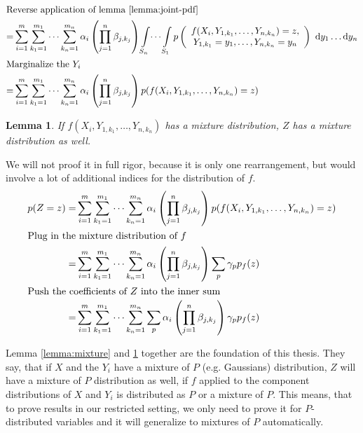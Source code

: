 \documentclass[11pt,a4paper]{book}
\newtheorem{lemma}{Lemma}
\newcommand{\ontopof}[2]{
  \begin{array}{c}
    #1,\\#2
  \end{array}
}
\begin{document}
\begin{proof2}
\begin{align*}
    \intertext{Reverse application of lemma \ref{lemma:joint-pdf}}
    = & \sum_{i = 1}^{m} \sum_{k_{1} = 1}^{m_{1}} \dots \sum_{k_{n} = 1}^{m_{n}} \alpha_{i} \left( \prod_{j = 1}^{n} \beta_{j,k_{j}} \right) \int\limits_{S_{n}} \dots \int\limits_{S_{1}} p\left( \ontopof{f(X_{i}, Y_{1,k_{1}}, \dots, Y_{n,k_{n}}) = z}{Y_{1,k_{1}} = y_{1}, \dots, Y_{n,k_{n}} = y_{n}} \right)~\mathrm{d}y_{1}\dots \mathrm{d}y_{n}\\
    \intertext{Marginalize the $Y_{i}$}
    = & \sum_{i = 1}^{m} \sum_{k_{1} = 1}^{m_{1}} \dots \sum_{k_{n} = 1}^{m_{n}} \alpha_{i} \left( \prod_{j = 1}^{n} \beta_{j,k_{j}} \right) p(f(X_{i}, Y_{1,k_{1}}, \dots, Y_{n,k_{n}}) = z)
  \end{align*}
\end{proof2}

\begin{lemma}
  \label{lemma:components}
  If $f(X_{i}, Y_{1,k_{1}}, \dots, Y_{n,k_{n}})$ has a mixture distribution, $Z$
  has a mixture distribution as well.
\end{lemma}
\begin{proof2}
  We will not proof it in full rigor, because it is only one rearrangement, but
  would involve a lot of additional indices for the distribution of $f$.
  \begin{align*}
    p(Z = z) = & \sum_{i = 1}^{m} \sum_{k_{1} = 1}^{m_{1}} \dots \sum_{k_{n} = 1}^{m_{n}} \alpha_{i} \left( \prod_{j = 1}^{n} \beta_{j,k_{j}} \right) p(f(X_{i}, Y_{1,k_{1}}, \dots, Y_{n,k_{n}}) = z)\\
    \intertext{Plug in the mixture distribution of $f$}
    = & \sum_{i = 1}^{m} \sum_{k_{1} = 1}^{m_{1}} \dots \sum_{k_{n} = 1}^{m_{n}} \alpha_{i} \left( \prod_{j = 1}^{n} \beta_{j,k_{j}} \right) \sum_{p} \gamma_{p} p_{f}(z)\\
    \intertext{Push the coefficients of $Z$ into the inner sum}
    = & \sum_{i = 1}^{m} \sum_{k_{1} = 1}^{m_{1}} \dots \sum_{k_{n} = 1}^{m_{n}} \sum_{p} \alpha_{i} \left( \prod_{j = 1}^{n} \beta_{j,k_{j}} \right) \gamma_{p} p_{f}(z)\\
  \end{align*}
\end{proof2}

Lemma \ref{lemma:mixture} and \ref{lemma:components} together are the foundation
of this thesis. They say, that if $X$ and the $Y_{i}$ have a mixture of $P$
(e.g. Gaussians) distribution, $Z$ will have a mixture of $P$ distribution as
well, if $f$ applied to the component distributions of $X$ and $Y_{i}$ is
distributed as $P$ or a mixture of $P$. This means, that to prove results in our
restricted setting, we only need to prove it for $P$-distributed variables and
it will generalize to mixtures of $P$ automatically.
\end{document}
